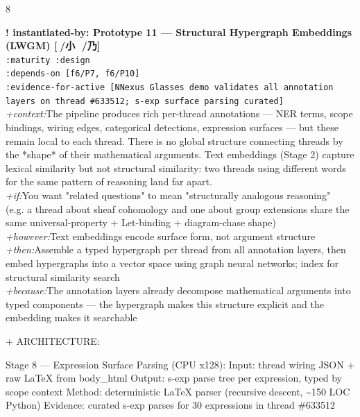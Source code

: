 \documentclass[landscape]{article}
\newcommand{\flexitag}[1]{\textcolor[gray]{0.35}{\textit{#1}}}
\begin{document}
\begin{paracol}{8}
\par
\par
\textbf{! instantiated-by: Prototype 11 — Structural Hypergraph Embeddings (LWGM) [🔸/小 🐲/乃]}\\
  \texttt{:\allowbreak{}maturity :\allowbreak{}design}\\
  \texttt{:\allowbreak{}depends-\allowbreak{}on [f6/\allowbreak{}P7,\allowbreak{} f6/\allowbreak{}P10]}\\
  \texttt{:\allowbreak{}evidence-\allowbreak{}for-\allowbreak{}active [NNexus Glasses demo validates all annotation layers on thread \#633512;\allowbreak{} s-\allowbreak{}exp surface parsing curated]}\\
  \flexitag{+context:}The pipeline produces rich per-thread annotations — NER terms, scope\\
    bindings, wiring edges, categorical detections, expression surfaces — but these remain local to each thread. There is no global structure connecting threads by the *shape* of their mathematical arguments. Text embeddings (Stage 2) capture lexical similarity but not structural similarity: two threads using different words for the same pattern of reasoning land far apart.\\
  \flexitag{+if:}You want "related questions" to mean "structurally analogous reasoning"\\
    (e.g. a thread about sheaf cohomology and one about group extensions share the same universal-property + Let-binding + diagram-chase shape)\\
  \flexitag{+however:}Text embeddings encode surface form, not argument structure\\
  \flexitag{+then:}Assemble a typed hypergraph per thread from all annotation layers, then\\
    embed hypergraphs into a vector space using graph neural networks; index for structural similarity search\\
  \flexitag{+because:}The annotation layers already decompose mathematical arguments into\\
    typed components — the hypergraph makes this structure explicit and the embedding makes it searchable\\
\par
  + ARCHITECTURE:\\
\par
    Stage 8 — Expression Surface Parsing (CPU x128): Input: thread wiring JSON + raw LaTeX from body\_html Output: s-exp parse tree per expression, typed by scope context Method: deterministic LaTeX parser (recursive descent, \textasciitilde{}150 LOC Python) Evidence: curated s-exp parses for 30 expressions in thread \#633512\\

\end{paracol}
\end{document}

